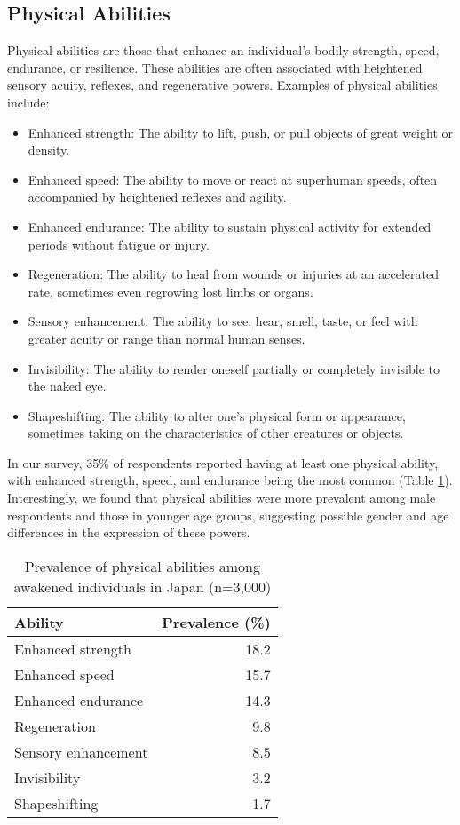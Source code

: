 \documentclass[12pt]{article}
\begin{document}
\subsection{Physical Abilities}
Physical abilities are those that enhance an individual's bodily strength, speed, endurance, or resilience. These abilities are often associated with heightened sensory acuity, reflexes, and regenerative powers. Examples of physical abilities include:

\begin{itemize}
    \item Enhanced strength: The ability to lift, push, or pull objects of great weight or density.
    \item Enhanced speed: The ability to move or react at superhuman speeds, often accompanied by heightened reflexes and agility.
    \item Enhanced endurance: The ability to sustain physical activity for extended periods without fatigue or injury.
    \item Regeneration: The ability to heal from wounds or injuries at an accelerated rate, sometimes even regrowing lost limbs or organs.
    \item Sensory enhancement: The ability to see, hear, smell, taste, or feel with greater acuity or range than normal human senses.
    \item Invisibility: The ability to render oneself partially or completely invisible to the naked eye.
    \item Shapeshifting: The ability to alter one's physical form or appearance, sometimes taking on the characteristics of other creatures or objects.
\end{itemize}

In our survey, 35\% of respondents reported having at least one physical ability, with enhanced strength, speed, and endurance being the most common (Table \ref{tab:physicalabilities}). Interestingly, we found that physical abilities were more prevalent among male respondents and those in younger age groups, suggesting possible gender and age differences in the expression of these powers.

\begin{table}[h]
\centering
\caption{Prevalence of physical abilities among awakened individuals in Japan (n=3,000)}
\label{tab:physicalabilities}
\begin{tabular}{lr}
\toprule
Ability & Prevalence (\%) \\
\midrule
Enhanced strength & 18.2 \\
Enhanced speed & 15.7 \\
Enhanced endurance & 14.3 \\
Regeneration & 9.8 \\
Sensory enhancement & 8.5 \\
Invisibility & 3.2 \\
Shapeshifting & 1.7 \\
\bottomrule
\end{tabular}
\end{table}
\end{document}
